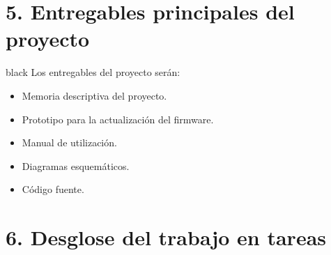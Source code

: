 \documentclass[11pt]{charter}
\providecommand{\DIFaddend}{} %
\begin{document}
\DIFaddend \section{5. Entregables principales del proyecto}
\label{sec:entregables}

\begin{consigna}{black}
Los entregables del proyecto serán:
\begin{itemize}
\item Memoria descriptiva del proyecto.
\item Prototipo para la actualización del firmware.
\item Manual de utilización.
\item Diagramas esquemáticos.
\item Código fuente.

\end{itemize}

\end{consigna}

\section{6. Desglose del trabajo en tareas}
\label{sec:wbs}
\end{document}
